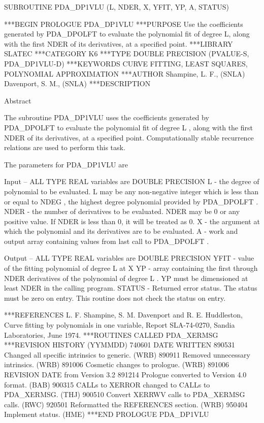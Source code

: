 \documentclass[11pt,twoside,nolof]{starlink}
\begin{document}
\begin{terminalv}
      SUBROUTINE PDA_DP1VLU (L, NDER, X, YFIT, YP, A, STATUS)


***BEGIN PROLOGUE  PDA_DP1VLU
***PURPOSE  Use the coefficients generated by PDA_DPOLFT to evaluate the
            polynomial fit of degree L, along with the first NDER of
            its derivatives, at a specified point.
***LIBRARY   SLATEC
***CATEGORY  K6
***TYPE      DOUBLE PRECISION (PVALUE-S, PDA_DP1VLU-D)
***KEYWORDS  CURVE FITTING, LEAST SQUARES, POLYNOMIAL APPROXIMATION
***AUTHOR  Shampine, L. F., (SNLA)
           Davenport, S. M., (SNLA)
***DESCRIPTION

     Abstract

     The subroutine  PDA_DP1VLU  uses the coefficients generated by  PDA_DPOLFT
     to evaluate the polynomial fit of degree  L , along with the first
     NDER  of its derivatives, at a specified point.  Computationally
     stable recurrence relations are used to perform this task.

     The parameters for  PDA_DP1VLU  are

     Input -- ALL TYPE REAL variables are DOUBLE PRECISION
         L -      the degree of polynomial to be evaluated.  L  may be
                  any non-negative integer which is less than or equal
                  to  NDEG , the highest degree polynomial provided
                  by  PDA_DPOLFT .
         NDER -   the number of derivatives to be evaluated.  NDER
                  may be 0 or any positive value.  If NDER is less
                  than 0, it will be treated as 0.
         X -      the argument at which the polynomial and its
                  derivatives are to be evaluated.
         A -      work and output array containing values from last
                  call to  PDA_DPOLFT .

     Output -- ALL TYPE REAL variables are DOUBLE PRECISION
         YFIT -   value of the fitting polynomial of degree  L  at  X
         YP -     array containing the first through  NDER  derivatives
                  of the polynomial of degree  L .  YP  must be
                  dimensioned at least  NDER  in the calling program.
         STATUS - Returned error status.
                  The status must be zero on entry. This
                  routine does not check the status on entry.

***REFERENCES  L. F. Shampine, S. M. Davenport and R. E. Huddleston,
                 Curve fitting by polynomials in one variable, Report
                 SLA-74-0270, Sandia Laboratories, June 1974.
***ROUTINES CALLED  PDA_XERMSG
***REVISION HISTORY  (YYMMDD)
   740601  DATE WRITTEN
   890531  Changed all specific intrinsics to generic.  (WRB)
   890911  Removed unnecessary intrinsics.  (WRB)
   891006  Cosmetic changes to prologue.  (WRB)
   891006  REVISION DATE from Version 3.2
   891214  Prologue converted to Version 4.0 format.  (BAB)
   900315  CALLs to XERROR changed to CALLs to PDA_XERMSG.  (THJ)
   900510  Convert XERRWV calls to PDA_XERMSG calls.  (RWC)
   920501  Reformatted the REFERENCES section.  (WRB)
   950404  Implement status.  (HME)
***END PROLOGUE  PDA_DP1VLU
\end{terminalv}
\end{document}
